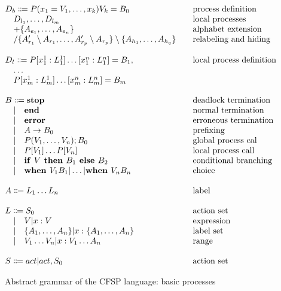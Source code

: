 \newenvironment{grammar}[2]
{\begin{tabular}{@{}>{$}l<{$}@{\qquad}l@{}}
		\multicolumn{1}{@{}l@{}}{$#1$}&\multicolumn{1}{l@{}}{#2}\\}
	{\end{tabular}}
\begin{figure}[H]
\[
\begin{grammar}{}{}
	D_b \Coloneqq P(x_1=V_1,\ldots,x_k)V_k=B_0 &process definition\\
	\quad D_{l_1},\ldots,D_{l_m}                        & local processes \\
	\quad +\{A_{e_1}, \ldots,A_{e_n} \}                           & alphabet extension \\
	\quad / \{A'_{r_1}\setminus A_{r_1},\ldots, A'_{r_p}\setminus A_{r_p} \} \setminus \{ A_{h_1},\ldots, A_{h_q} \}                         & relabeling and hiding \\
	\\
	D_l \Coloneqq P[x_1^1:L_1^1]\ldots[x_1^n:L_1^n]=B_1, &local process definition\\
	\quad \ldots                        &  \\
	\quad P[x_m^1:L_m^1]\ldots[x_m^n:L_m^n]=B_m &\\
	\\
	B \Coloneqq \text{\textbf{stop}} &deadlock termination\\
	\quad |\quad  \text{\textbf{end}} &normal termination\\
	\quad |\quad  \text{\textbf{error}} &erroneous termination\\
	\quad |\quad  A \rightarrow B_0 &prefixing\\	
	\quad |\quad  P(V_1,\ldots, V_n);B_0 &global process cal\\		
	\quad |\quad  P[V_1]\ldots P[V_n] &local process call\\	
	\quad |\quad  \text{\textbf{if }} V \text{\textbf{ then }} B_1 \text{\textbf{ else }} B_2&conditional branching\\
	\quad |\quad  \text{\textbf{when }} V_1 B_1 | \ldots | \text{\textbf{when }} V_n B_n &choice\\	
	\\
	A \Coloneqq L_1 \ldots L_n &label\\	
	\\
	L \Coloneqq S_0 &action set\\		
	\quad |\quad  V | x:V &expression\\	
	\quad |\quad  \{ A_1, \ldots, A_n \} | x:\{ A_1, \ldots, A_n \} &label set\\	
	\quad |\quad  V_1\ldots V_n | x:V_1\ldots A_n  &range\\		
	\\
	S \Coloneqq act | act, S_0 &action set
\end{grammar}
\]
\label{fig:cfsp_basic_grammar}
\caption{Abstract grammar of the CFSP language: basic processes}
\MediumPicture
\end{figure}


